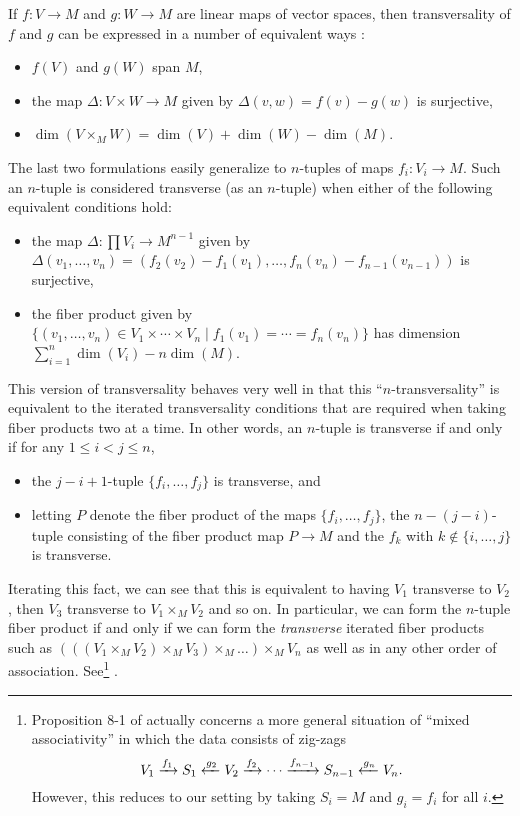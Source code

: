 \begin{remark}
	If $f \colon V \to M$ and $g \colon W \to M$ are linear maps of vector spaces, then transversality of $f$ and $g$ can be expressed in a number of equivalent ways \cite[Section 4.7]{RamBas09}:
	\begin{itemize}
		\item $f(V)$ and $g(W)$ span $M$,
		\item the map $\Delta \colon V \times W \to M$ given by $\Delta(v,w) = f(v)-g(w)$ is surjective,
		\item $\dim(V \times_MW) = \dim(V)+\dim(W)-\dim(M)$.
	\end{itemize}
	The last two formulations easily generalize to $n$-tuples of maps $f_i \colon V_i \to M$.
	Such an $n$-tuple is considered transverse (as an $n$-tuple) when either of the following equivalent conditions hold:
	\begin{itemize}
		\item the map $\Delta \colon \prod V_i \to M^{n-1}$ given by $\Delta(v_1,\ldots,v_n) = (f_2(v_2)-f_1(v_1),\ldots, f_n(v_n)-f_{n-1}(v_{n-1}))$ is surjective,
		\item the fiber product given by $\{(v_1,\ldots,v_n) \in V_1 \times \cdots \times V_n \mid f_1(v_1) = \cdots = f_n(v_n)\}$ has dimension $\sum_{i = 1}^n\dim(V_i) -n\dim(M)$.
	\end{itemize}
	This version of transversality behaves very well in that this ``$n$-transversality'' is equivalent to the iterated transversality conditions that are required when taking fiber products two at a time.
	In other words, an $n$-tuple is transverse if and only if for any $1 \leq i<j \leq n$,
	\begin{itemize}
		\item the $j-i+1$-tuple $\{f_i,\ldots,f_j\}$ is transverse, and
		\item letting $P$ denote the fiber product of the maps $\{f_i,\ldots,f_j\}$, the $n-(j-i)$-tuple consisting of the fiber product map $P \to M$ and the $f_k$ with $k\notin\{i,\ldots,j\}$ is transverse.
	\end{itemize}
	Iterating this fact, we can see that this is equivalent to having $V_1$ transverse to $V_2$, then $V_3$ transverse to $V_1 \times_MV_2$ and so on.
	In particular, we can form the $n$-tuple fiber product if and only if we can form the \textit{transverse} iterated fiber products such as $(((V_1 \times_MV_2) \times_M V_3) \times_M\ldots) \times_M V_n$ as well as in any other order of association.
	See\footnote{Proposition 8-1 of \cite{RamBas09} actually concerns a more general situation of ``mixed associativity'' in which the data consists of zig-zags
	$$V_1 \xrightarrow{f_1}S_1\xleftarrow{g_2}V_2 \xrightarrow{f_2}\cdots \xrightarrow{f_{n-1}}S_{n-1}\xleftarrow{g_n}V_n.$$
	However, this reduces to our setting by taking $S_i = M$ and $g_i = f_i$ for all $i$.}
	\cite[Propositions~4-9 and 8-1]{RamBas09}.


\end{remark}
